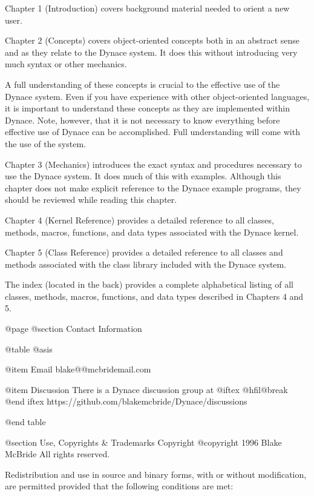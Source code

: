 Chapter 1 (Introduction) covers background material needed to orient
a new user.

Chapter 2 (Concepts) covers object-oriented concepts both in an abstract
sense and as they relate to the Dynace system.  It does this without
introducing very much syntax or other mechanics.

A full understanding of these concepts is crucial to the effective use
of the Dynace system.  Even if you have experience with other object-oriented 
languages, it is important to understand these concepts as they
are implemented within Dynace.  Note, however, that it is not necessary to
know everything before effective use of Dynace can be accomplished.  Full
understanding will come with the use of the system.

Chapter 3 (Mechanics) introduces the exact syntax and procedures
necessary to use the Dynace system.  It does much of this with examples.
Although this chapter does not make explicit reference to the Dynace example
programs, they should be reviewed while reading this chapter.

Chapter 4 (Kernel Reference) provides a detailed reference to all
classes, methods, macros, functions, and data types associated with
the Dynace kernel.

Chapter 5 (Class Reference)  provides a detailed reference to all
classes and methods associated with the class library included
with the Dynace system.

The index (located in the back) provides a complete alphabetical
listing of all classes, methods, macros, functions, and data types
described in Chapters 4 and 5.






@page
@section Contact Information

@table @asis

@item Email
blake@@mcbridemail.com

@item Discussion
There is a Dynace discussion group at 
@iftex
@hfil@break
@end iftex
https://github.com/blakemcbride/Dynace/discussions

@end table




@section Use, Copyrights & Trademarks
Copyright  @copyright{} 1996 Blake McBride
All rights reserved.

Redistribution and use in source and binary forms, with or without
modification, are permitted provided that the following conditions are
met:

